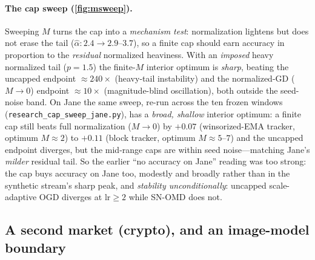 \documentclass{article}
\begin{document}
\paragraph{The cap sweep (\cref{fig:msweep}).} Sweeping $M$ turns the cap into a
\emph{mechanism test}: normalization lightens but does not erase the tail
($\hat\alpha\!:2.4\to2.9$--$3.7$), so a finite cap should earn accuracy in proportion to the
\emph{residual} normalized heaviness. With an \emph{imposed} heavy normalized tail ($p{=}1.5$)
the finite-$M$ interior optimum is \emph{sharp}, beating the uncapped endpoint $\approx240\times$
(heavy-tail instability) and the normalized-GD ($M\!\to\!0$) endpoint $\approx10\times$
(magnitude-blind oscillation), both outside the seed-noise band. On Jane the same sweep, re-run
across the ten frozen windows (\texttt{research\_cap\_sweep\_jane.py}), has a \emph{broad,
shallow} interior optimum: a finite cap still beats full normalization ($M\!\to\!0$) by
${+}0.07$ (winsorized-EMA tracker, optimum $M{\approx}2$) to ${+}0.11$ (block tracker, optimum
$M{\approx}5$--$7$) and the uncapped endpoint diverges, but the mid-range caps are within seed
noise---matching Jane's \emph{milder} residual tail. So the earlier ``no accuracy on Jane''
reading was too strong: the cap buys accuracy on Jane too, modestly and broadly rather than in
the synthetic stream's sharp peak, and \emph{stability unconditionally}: uncapped scale-adaptive
OGD diverges at $\mathrm{lr}\ge2$ while SN-OMD does not.

\subsection{A second market (crypto), and an image-model boundary}
\label{app:secondmarket}
\end{document}
